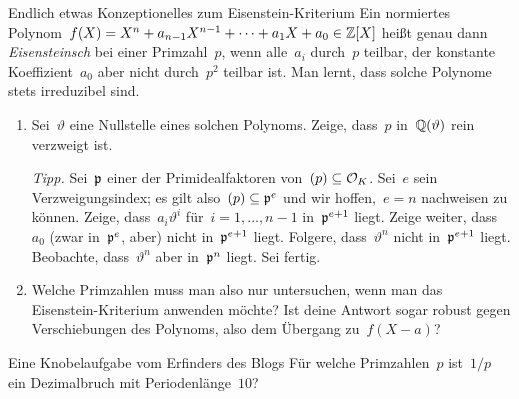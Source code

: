 \documentclass{uebblatt}
\begin{document}
\begin{aufgabe}{Endlich etwas Konzeptionelles zum Eisenstein-Kriterium}
Ein normiertes Polynom~$f(X) = X^n + a_{n-1}X^{n-1} + \cdots + a_1X + a_0 \in \mathbb{Z}[X]$
heißt genau dann \emph{Eisensteinsch} bei einer Primzahl~$p$, wenn alle~$a_i$
durch~$p$ teilbar, der konstante Koeffizient~$a_0$ aber nicht durch~$p^2$ teilbar ist.
Man lernt, dass solche Polynome stets irreduzibel sind.
\begin{enumerate}
\item Sei~$\vartheta$ eine Nullstelle eines solchen Polynoms. Zeige, dass~$p$
in~$\mathbb{Q}(\vartheta)$ rein verzweigt ist.

{\tiny\emph{Tipp.} Sei~$\mathfrak{p}$ einer der Primidealfaktoren von~$(p) \subseteq
\mathcal{O}_K$. Sei~$e$ sein Verzweigungsindex; es gilt also~$(p) \subseteq \mathfrak{p}^e$ und
wir hoffen,~$e = n$ nachweisen zu können. Zeige, dass~$a_i \vartheta^i$ für~$i
= 1,\ldots,n-1$ in~$\mathfrak{p}^{e+1}$ liegt. Zeige weiter, dass~$a_0$ (zwar
in~$\mathfrak{p}^e$, aber) nicht in~$\mathfrak{p}^{e+1}$ liegt. Folgere, dass~$\vartheta^n$
nicht in~$\mathfrak{p}^{e+1}$ liegt. Beobachte, dass~$\vartheta^n$ aber in~$\mathfrak{p}^n$
liegt. Sei fertig.\par}

\item Welche Primzahlen muss man also nur untersuchen, wenn man das
Eisenstein-Kriterium anwenden möchte? Ist deine Antwort
sogar robust gegen Verschiebungen des Polynoms, also dem Übergang zu~$f(X-a)$?
\end{enumerate}
\end{aufgabe}

\begin{aufgabe*}{Eine Knobelaufgabe vom Erfinders des Blogs}
Für welche Primzahlen~$p$ ist~$1/p$ ein Dezimalbruch mit Periodenlänge~$10$?
\end{aufgabe*}
\end{document}
